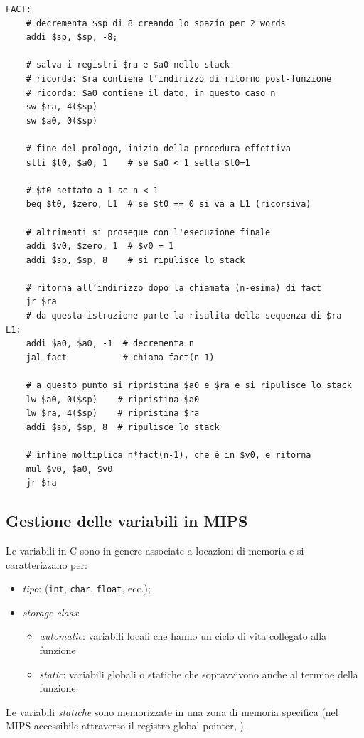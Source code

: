 \documentclass[class=book, crop=false, oneside]{standalone}
\begin{document}
\begin{verbatim}
FACT:
	# decrementa $sp di 8 creando lo spazio per 2 words
	addi $sp, $sp, -8;

	# salva i registri $ra e $a0 nello stack
	# ricorda: $ra contiene l'indirizzo di ritorno post-funzione
	# ricorda: $a0 contiene il dato, in questo caso n
	sw $ra, 4($sp)
	sw $a0, 0($sp)

	# fine del prologo, inizio della procedura effettiva
	slti $t0, $a0, 1    # se $a0 < 1 setta $t0=1

	# $t0 settato a 1 se n < 1
	beq $t0, $zero, L1  # se $t0 == 0 si va a L1 (ricorsiva)

	# altrimenti si prosegue con l'esecuzione finale
	addi $v0, $zero, 1  # $v0 = 1
	addi $sp, $sp, 8    # si ripulisce lo stack

	# ritorna all’indirizzo dopo la chiamata (n-esima) di fact
	jr $ra
	# da questa istruzione parte la risalita della sequenza di $ra
L1:
	addi $a0, $a0, -1  # decrementa n
	jal fact           # chiama fact(n-1)

	# a questo punto si ripristina $a0 e $ra e si ripulisce lo stack
	lw $a0, 0($sp)    # ripristina $a0
	lw $ra, 4($sp)    # ripristina $ra
	addi $sp, $sp, 8  # ripulisce lo stack

	# infine moltiplica n*fact(n-1), che è in $v0, e ritorna
	mul $v0, $a0, $v0
	jr $ra
\end{verbatim}

\subsection{Gestione delle variabili in MIPS}
Le variabili in C sono in genere associate a locazioni di memoria e si caratterizzano per:
\begin{itemize}
	\item \emph{tipo}: (\texttt{int}, \texttt{char}, \texttt{float}, ecc.);
	\item \emph{storage class}:
	\begin{itemize}
		\item \emph{automatic}: variabili locali che hanno un ciclo di vita collegato alla funzione
		\item \emph{static}: variabili globali o statiche che sopravvivono anche al termine della funzione.
	\end{itemize}
\end{itemize}

Le variabili \emph{statiche} sono memorizzate in una zona di memoria specifica (nel MIPS accessibile attraverso il registro global pointer, ).
\end{document}
